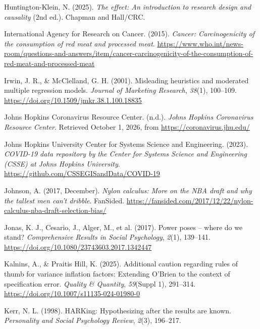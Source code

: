 \documentclass[
]{book}
\newlength{\cslhangindent}
\newenvironment{CSLReferences}[2] %
 {\begin{list}{}{%
  \setlength{\itemindent}{0pt}
  \setlength{\leftmargin}{0pt}
  \setlength{\parsep}{0pt}
  \ifodd #1
   \setlength{\leftmargin}{\cslhangindent}
   \setlength{\itemindent}{-1\cslhangindent}
  \fi
  \setlength{\itemsep}{#2\baselineskip}}}
 {\end{list}}
\begin{document}
\begin{CSLReferences}{1}{0}
Huntington-Klein, N. (2025). \emph{The effect: An introduction to research design and causality} (2nd ed.). {Chapman and Hall/CRC}.

International Agency for Research on Cancer. (2015). \emph{Cancer: Carcinogenicity of the consumption of red meat and processed meat}. \url{https://www.who.int/news-room/questions-and-answers/item/cancer-carcinogenicity-of-the-consumption-of-red-meat-and-processed-meat}

Irwin, J. R., \& McClelland, G. H. (2001). Misleading heuristics and moderated multiple regression models. \emph{Journal of Marketing Research}, \emph{38}(1), 100--109. \url{https://doi.org/10.1509/jmkr.38.1.100.18835}

Johns Hopkins Coronavirus Resource Center. (n.d.). \emph{{Johns Hopkins Coronavirus Resource Center}}. Retrieved October 1, 2026, from \url{https://coronavirus.jhu.edu/}

Johns Hopkins University Center for Systems Science and Engineering. (2023). \emph{{COVID-19} data repository by the {Center for Systems Science and Engineering} ({CSSE}) at {Johns Hopkins University}}. \url{https://github.com/CSSEGISandData/COVID-19}

Johnson, A. (2017, December). \emph{Nylon calculus: More on the {NBA} draft and why the tallest men can't dribble}. FanSided. \url{https://fansided.com/2017/12/22/nylon-calculus-nba-draft-selection-bias/}

{Jonas, K. J., Cesario, J., Alger, M., et al.} (2017). Power poses -- where do we stand? \emph{Comprehensive Results in Social Psychology}, \emph{2}(1), 139--141. \url{https://doi.org/10.1080/23743603.2017.1342447}

Kalnins, A., \& Praitis Hill, K. (2025). Additional caution regarding rules of thumb for variance inflation factors: Extending {O'Brien} to the context of specification error. \emph{Quality \& Quantity}, \emph{59}(Suppl 1), 291--314. \url{https://doi.org/10.1007/s11135-024-01980-0}

Kerr, N. L. (1998). {HARKing}: Hypothesizing after the results are known. \emph{Personality and Social Psychology Review}, \emph{2}(3), 196--217.


\end{CSLReferences}
\end{document}
